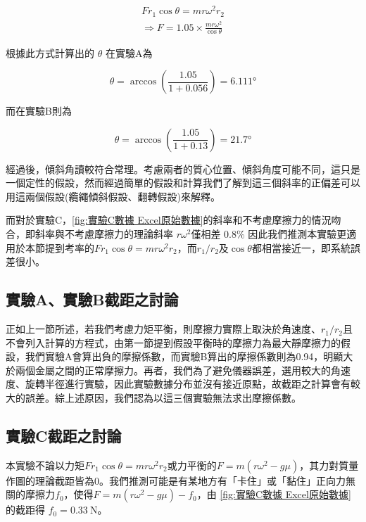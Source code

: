 \documentclass[11pt,a4paper]{article}
\theoremstyle{definition}
\begin{document}
            \begin{gather}
                F r_1 \cos{\theta} = mr\omega^2 r_2\\
                \Rightarrow F = 1.05 \times \frac{mr\omega^2}{\cos{\theta}}
            \end{gather}

            根據此方式計算出的 $\theta$ 在實驗A為

            \begin{equation}
               \theta = \arccos\left( \frac{1.05}{1 + 0.056} \right) = \ang{6.111}
            \end{equation}

            而在實驗B則為

            \begin{equation}
               \theta = \arccos\left( \frac{1.05}{1 + 0.13} \right) = \ang{21.7}
            \end{equation}

            經過後，傾斜角讀較符合常理。考慮兩者的質心位置、傾斜角度可能不同，這只是一個定性的假設，然而經過簡單的假設和計算我們了解到這三個斜率的正偏差可以用這兩個假設(纜繩傾斜假設、翻轉假設)來解釋。

            而對於實驗C，\autoref{fig:實驗C數據 Excel原始數據}的斜率和不考慮摩擦力的情況吻合，即斜率與不考慮摩擦力的理論斜率 $r\omega^2$僅相差 0.8\% 因此我們推測本實驗更適用於本節提到考率的$F r_1 \cos{\theta} = mr\omega^2 r_2$，而$r_1/r_2$及${\cos{\theta}}$都相當接近一，即系統誤差很小。

        \subsection{實驗A、實驗B截距之討論}

            正如上一節所述，若我們考慮力矩平衡，則摩擦力實際上取決於角速度、$r_1/r_2$且不會列入計算的方程式，由第一節提到假設平衡時的摩擦力為最大靜摩擦力的假設，我們實驗A會算出負的摩擦係數，而實驗B算出的摩擦係數則為0.94，明顯大於兩個金屬之間的正常摩擦力。再者，我們為了避免儀器誤差，選用較大的角速度、旋轉半徑進行實驗，因此實驗數據分布並沒有接近原點，故截距之計算會有較大的誤差。綜上述原因，我們認為以這三個實驗無法求出摩擦係數。

        \subsection{實驗C截距之討論}

            \par
            本實驗不論以力矩$F r_1 \cos{\theta} = mr\omega^2 r_2$或力平衡的$F = m(r\omega^2 - g \mu)$，其力對質量作圖的理論截距皆為0。我們推測可能是有某地方有「卡住」或「黏住」正向力無關的摩擦力$f_0$，使得$F = m(r\omega^2 - g \mu) - f_0$，由 \autoref{fig:實驗C數據 Excel原始數據} 的截距得 $f_0 = \SI{0.33}{\newton}$。
        
\end{document}
